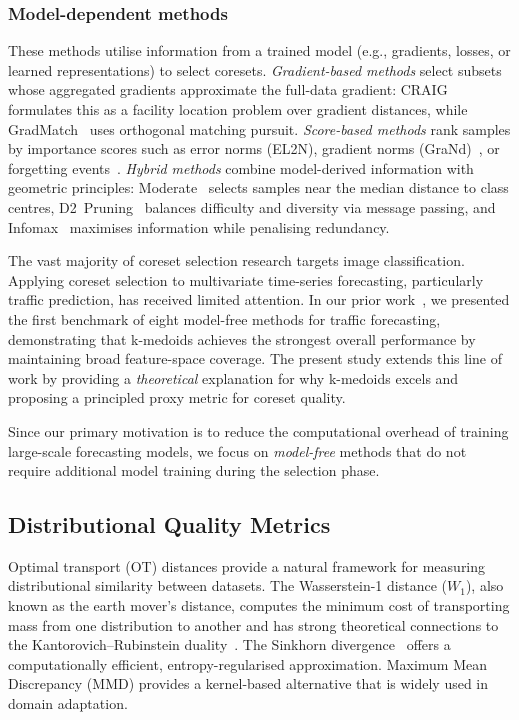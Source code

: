 \documentclass[journal]{IEEEtran}
\newcommand{\Wone}{W_1}
\begin{document}
\subsubsection{Model-dependent methods}
These methods utilise information from a trained model (e.g.,
gradients, losses, or learned representations) to select coresets.
\emph{Gradient-based methods} select subsets whose aggregated
gradients approximate the full-data gradient:
CRAIG~\cite{mirzasoleiman_coresets_2020} formulates this as a
facility location problem over gradient distances, while
GradMatch~\cite{killamsetty_grad-match_2021} uses orthogonal
matching pursuit.
\emph{Score-based methods} rank samples by importance scores such
as error norms (EL2N), gradient norms
(GraNd)~\cite{paul_deep_2021}, or forgetting
events~\cite{toneva_empirical_2018}.
\emph{Hybrid methods} combine model-derived information with
geometric principles:
Moderate~\cite{xia_moderate_2022} selects samples near the median
distance to class centres,
D2~Pruning~\cite{maharana_d2_2023} balances difficulty and
diversity via message passing, and
Infomax~\cite{tan_data_2025} maximises information while
penalising redundancy.

The vast majority of coreset selection research targets image
classification.
Applying coreset selection to multivariate time-series forecasting,
particularly traffic prediction, has received limited attention.
In our prior work~\cite{our_itsc}, we presented the first benchmark
of eight model-free methods for traffic forecasting, demonstrating
that k-medoids achieves the strongest overall performance by
maintaining broad feature-space coverage.
The present study extends this line of work by providing a
\emph{theoretical} explanation for why k-medoids excels and
proposing a principled proxy metric for coreset quality.

Since our primary motivation is to reduce the computational overhead
of training large-scale forecasting models, we focus on
\emph{model-free} methods that do not require additional model
training during the selection phase.


\subsection{Distributional Quality Metrics}
\label{sec:related-metrics}

Optimal transport (OT) distances provide a natural framework for
measuring distributional similarity between datasets.
The Wasserstein-1 distance ($\Wone$), also known as the earth
mover's distance, computes the minimum cost of transporting mass
from one distribution to another and has strong theoretical
connections to the Kantorovich--Rubinstein
duality~\cite{villani_optimal_2009}.
The Sinkhorn divergence~\cite{cuturi_sinkhorn_2013} offers a
computationally efficient, entropy-regularised approximation.
Maximum Mean Discrepancy (MMD) provides a kernel-based alternative
that is widely used in domain adaptation.
\end{document}

